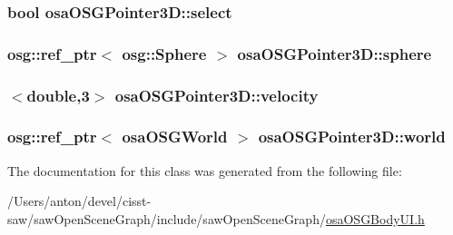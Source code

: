 \subsubsection[{select}]{\setlength{\rightskip}{0pt plus 5cm}bool osa\+O\+S\+G\+Pointer3\+D\+::select\hspace{0.3cm}{\ttfamily [protected]}}\label{classosa_o_s_g_pointer3_d_acd02af84dcccbf5bb89fda754600414d}
\hypertarget{classosa_o_s_g_pointer3_d_a3f2f4ea0fac395d6b6a8cb20af610d9d}{}
\subsubsection[{sphere}]{\setlength{\rightskip}{0pt plus 5cm}osg\+::ref\+\_\+ptr$<$ osg\+::\+Sphere $>$ osa\+O\+S\+G\+Pointer3\+D\+::sphere\hspace{0.3cm}{\ttfamily [protected]}}\label{classosa_o_s_g_pointer3_d_a3f2f4ea0fac395d6b6a8cb20af610d9d}
\hypertarget{classosa_o_s_g_pointer3_d_a9ed8936280696f8f7bd78bb1d20e7d81}{}
\subsubsection[{velocity}]{$<$double,3$>$ osa\+O\+S\+G\+Pointer3\+D\+::velocity\hspace{0.3cm}{\ttfamily [protected]}}\label{classosa_o_s_g_pointer3_d_a9ed8936280696f8f7bd78bb1d20e7d81}
\hypertarget{classosa_o_s_g_pointer3_d_a6576d36096a1c3a9127fbf9dbafee677}{}
\subsubsection[{world}]{\setlength{\rightskip}{0pt plus 5cm}osg\+::ref\+\_\+ptr$<$ {\bf osa\+O\+S\+G\+World} $>$ osa\+O\+S\+G\+Pointer3\+D\+::world\hspace{0.3cm}{\ttfamily [protected]}}\label{classosa_o_s_g_pointer3_d_a6576d36096a1c3a9127fbf9dbafee677}


The documentation for this class was generated from the following file\+:\begin{DoxyCompactItemize}
\item 
/\+Users/anton/devel/cisst-\/saw/saw\+Open\+Scene\+Graph/include/saw\+Open\+Scene\+Graph/\hyperlink{osa_o_s_g_body_u_i_8h}{osa\+O\+S\+G\+Body\+U\+I.\+h}\end{DoxyCompactItemize}
